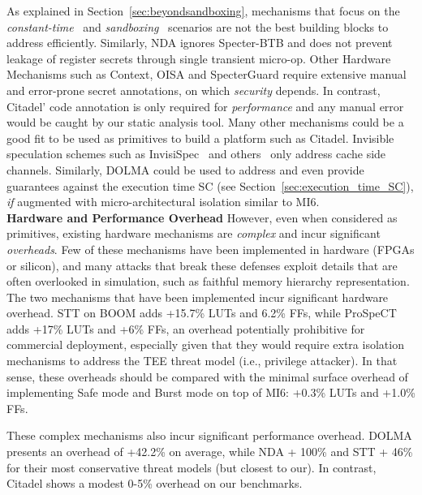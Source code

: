 As explained in Section~\ref{sec:beyondsandboxing}, mechanisms that focus on the \emph{constant-time}~\cite{daniel2023prospect, choudhary2021speculative} and \emph{sandboxing}~\cite{yu2019speculative,jauch2023secure,barber2019specshield, yu2020speculative} scenarios are not the best building blocks to address \prob{} efficiently.
Similarly, NDA\cite{weisse2019nda} ignores Specter-BTB and does not prevent leakage of
register secrets through single transient micro-op.
Other Hardware Mechanisms such as Context\cite{schwarz2020context}, OISA\cite{yu2018data} and SpecterGuard\cite{fustos2019spectreguard} require extensive manual and error-prone secret annotations, on which \emph{security} depends.
In contrast, Citadel' code annotation is only required for \emph{performance} and any manual error would be caught by our static analysis tool.
Many other mechanisms could be a good fit to be used as primitives to build a platform such as Citadel.
Invisible speculation schemes such as InvisiSpec~\cite{yan2018invisispec} and others~\cite{ainsworth2020muontrap, khasawneh2019safespec, kiriansky2018dawg, li2019conditional, saileshwar2019cleanupspec, sakalis2019efficient, ainsworth2021ghostminion} only address cache side channels.
Similarly, DOLMA\cite{loughlin2021dolma} could be used to address \prob{} and even provide guarantees against the execution time SC (see Section~\ref{sec:execution_time_SC}), \emph{if} augmented with micro-architectural isolation similar to MI6.
\\

\noindent\textbf{Hardware and Performance Overhead}
However, even when considered as primitives, existing hardware mechanisms are \emph{complex} and incur significant \emph{overheads}.
Few of these mechanisms have been implemented in hardware (FPGAs or silicon), and many attacks that break these defenses \cite{yang2023pensieve} exploit details that are often overlooked in simulation, such as faithful memory hierarchy representation.
The two mechanisms that have been implemented incur significant hardware overhead.
STT on BOOM \cite{jauch2023secure} adds +15.7\% LUTs and 6.2\% FFs, while ProSpeCT \cite{daniel2023prospect} adds +17\% LUTs and +6\% FFs, an overhead potentially prohibitive for commercial deployment, especially given that they would require extra isolation mechanisms to address the TEE threat model (i.e., privilege attacker).
In that sense, these overheads should be compared with the minimal surface overhead of implementing Safe mode and Burst mode on top of MI6: +0.3\% LUTs and +1.0\% FFs.

These complex mechanisms also incur significant performance overhead.
DOLMA presents an overhead of +42.2\% on average, while NDA + 100\% and STT + 46\% for their most conservative threat models (but closest to our).
In contrast, Citadel shows a modest 0-5\% overhead on our benchmarks.